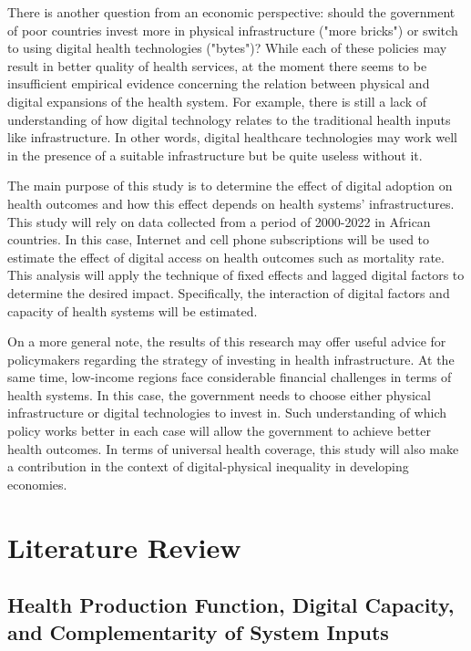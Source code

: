 \documentclass[12pt]{article}
\begin{document}
\medskip            
There is another question from an economic perspective: should the government of poor countries invest more in physical infrastructure ("more bricks") or switch to using digital health technologies ("bytes")? While each of these policies may result in better quality of health services, at the moment there seems to be insufficient empirical evidence concerning the relation between physical and digital expansions of the health system. For example, there is still a lack of understanding of how digital technology relates to the traditional health inputs like infrastructure. In other words, digital healthcare technologies may work well in the presence of a suitable infrastructure but be quite useless without it.

\medskip
The main purpose of this study is to determine the effect of digital adoption on health outcomes and how this effect depends on health systems' infrastructures. This study will rely on data collected from a period of 2000-2022 in African countries. In this case, Internet and cell phone subscriptions will be used to estimate the effect of digital access on health outcomes such as mortality rate. This analysis will apply the technique of fixed effects and lagged digital factors to determine the desired impact. Specifically, the interaction of digital factors and capacity of health systems will be estimated.

\medskip
On a more general note, the results of this research may offer useful advice for policymakers regarding the strategy of investing in health infrastructure. At the same time, low-income regions face considerable financial challenges in terms of health systems. In this case, the government needs to choose either physical infrastructure or digital technologies to invest in. Such understanding of which policy works better in each case will allow the government to achieve better health outcomes. In terms of universal health coverage, this study will also make a contribution in the context of digital-physical inequality in developing economies.

\section{Literature Review}

\subsection{Health Production Function, Digital Capacity, and Complementarity of System Inputs}
\end{document}
